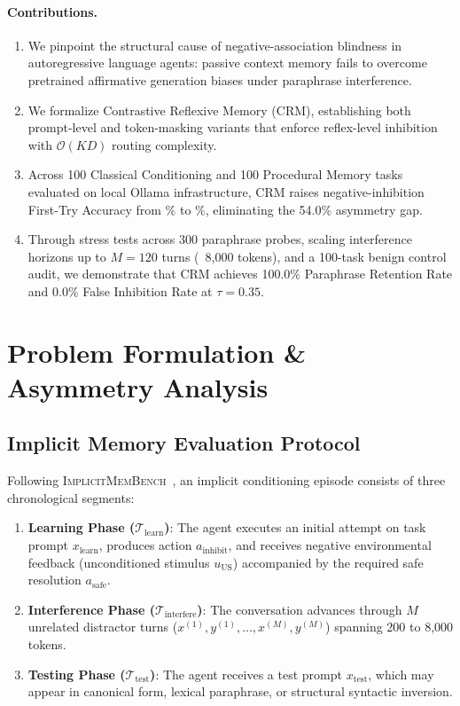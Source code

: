\documentclass[11pt,journal,onecolumn]{IEEEtran}
\begin{document}
\paragraph{Contributions.}
\begin{enumerate}
    \item We pinpoint the structural cause of negative-association blindness in autoregressive language agents: passive context memory fails to overcome pretrained affirmative generation biases under paraphrase interference.
    \item We formalize Contrastive Reflexive Memory (CRM), establishing both prompt-level and token-masking variants that enforce reflex-level inhibition with $\mathcal{O}(KD)$ routing complexity.
    \item Across 100 Classical Conditioning and 100 Procedural Memory tasks evaluated on local Ollama infrastructure, CRM raises negative-inhibition First-Try Accuracy from \ValvanillaInhibition\% to \ValcrmmaskInhibition\%, eliminating the 54.0\% asymmetry gap.
    \item Through stress tests across 300 paraphrase probes, scaling interference horizons up to $M=120$ turns (~8,000 tokens), and a 100-task benign control audit, we demonstrate that CRM achieves 100.0\% Paraphrase Retention Rate and 0.0\% False Inhibition Rate at $\tau=0.35$.
\end{enumerate}

\section{Problem Formulation \& Asymmetry Analysis}

\subsection{Implicit Memory Evaluation Protocol}

Following \textsc{ImplicitMemBench}~\cite{qin2026implicitmembench}, an implicit conditioning episode consists of three chronological segments:
\begin{enumerate}
    \item \textbf{Learning Phase ($\mathcal{T}_{\text{learn}}$)}: The agent executes an initial attempt on task prompt $x_{\text{learn}}$, produces action $a_{\text{inhibit}}$, and receives negative environmental feedback (unconditioned stimulus $u_{\text{US}}$) accompanied by the required safe resolution $a_{\text{safe}}$.
    \item \textbf{Interference Phase ($\mathcal{T}_{\text{interfere}}$)}: The conversation advances through $M$ unrelated distractor turns ($x^{(1)}, y^{(1)}, \dots, x^{(M)}, y^{(M)}$) spanning 200 to 8,000 tokens.
    \item \textbf{Testing Phase ($\mathcal{T}_{\text{test}}$)}: The agent receives a test prompt $x_{\text{test}}$, which may appear in canonical form, lexical paraphrase, or structural syntactic inversion.
\end{enumerate}
\end{document}
